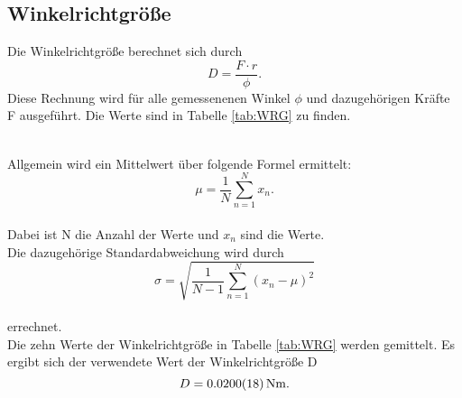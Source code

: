 \subsection{Winkelrichtgröße}
Die Winkelrichtgröße berechnet sich durch
\begin{equation}
  D = \frac{F\cdot r}{\phi}.
\label{eqn:WRG}
\end{equation}
Diese Rechnung wird für alle gemessenenen Winkel $\phi$ und dazugehörigen Kräfte F ausgeführt.
Die Werte sind in Tabelle \ref{tab:WRG} zu finden.

\\Allgemein wird ein Mittelwert über folgende Formel ermittelt:
\begin{equation}
  \mu = \frac{1}{N} \sum_{n=1}^{N} x_{n}.
\label{eqn:mw}
\end{equation}
\\Dabei ist N die Anzahl der Werte und $x_{n}$ sind die Werte.
\\Die dazugehörige Standardabweichung wird durch
\begin{equation}
  \sigma =  \sqrt{  \frac{1}{N-1}  \sum_{n=1}^{N} (x_{n} - \mu)^2 }
\label{eqn:sigma}
\end{equation}
\\errechnet.
\\Die zehn Werte der Winkelrichtgröße in Tabelle \ref{tab:WRG} werden gemittelt.
Es ergibt sich der verwendete Wert der Winkelrichtgröße D
\begin{equation*}
  D = \SI{0.0200 \pm 0.0018}{Nm}.
\end{equation*}


